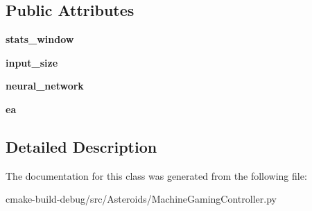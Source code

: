 \subsection*{Public Attributes}
\begin{DoxyCompactItemize}
\item 
{\bfseries stats\+\_\+window}\hypertarget{classMachineGamingController_1_1MachineGamingController_a5c7fa65b5ff61ced3e53b6a75be9b447}{}\label{classMachineGamingController_1_1MachineGamingController_a5c7fa65b5ff61ced3e53b6a75be9b447}

\item 
{\bfseries input\+\_\+size}\hypertarget{classMachineGamingController_1_1MachineGamingController_a5d895aaebf825121920b865c58f1e4a4}{}\label{classMachineGamingController_1_1MachineGamingController_a5d895aaebf825121920b865c58f1e4a4}

\item 
{\bfseries neural\+\_\+network}\hypertarget{classMachineGamingController_1_1MachineGamingController_a3976256fc7d27ebe7d28ec536911d62e}{}\label{classMachineGamingController_1_1MachineGamingController_a3976256fc7d27ebe7d28ec536911d62e}

\item 
{\bfseries ea}\hypertarget{classMachineGamingController_1_1MachineGamingController_afa9b244a5044affb82da318a3334d380}{}\label{classMachineGamingController_1_1MachineGamingController_afa9b244a5044affb82da318a3334d380}

\end{DoxyCompactItemize}


\subsection{Detailed Description}
\begin{DoxyVerb}\end{DoxyVerb}
 

The documentation for this class was generated from the following file\+:\begin{DoxyCompactItemize}
\item 
cmake-\/build-\/debug/src/\+Asteroids/Machine\+Gaming\+Controller.\+py\end{DoxyCompactItemize}
